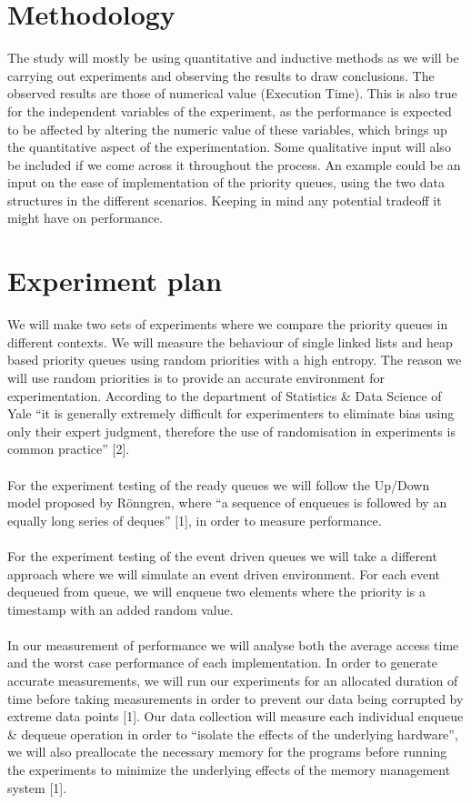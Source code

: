 \documentclass[12pt]{article}
\begin{document}
\section{Methodology}

 The study will mostly be using quantitative and inductive methods as we will be carrying out experiments and observing the results to draw conclusions. The observed results are those of numerical value (Execution Time). This is also true for the independent variables of the experiment, as the performance is expected to be affected by altering the numeric value of these variables, which brings up the quantitative aspect of the experimentation. Some qualitative input will also be included if we come across it throughout the process. An example could be an input on the ease of implementation of the priority queues, using the two data structures in the different scenarios. Keeping in mind any potential tradeoff it might have on performance. 
 
\section{Experiment plan}

We will make two sets of experiments where we compare the priority queues in different contexts. We will measure the behaviour of single linked lists and heap based priority queues using random priorities with a high entropy. The reason we will use random priorities is to provide an accurate environment for experimentation. According to the department of Statistics \& Data Science of Yale “it is generally extremely difficult for experimenters to eliminate bias using only their expert judgment, therefore the use of randomisation in experiments is common practice” [2]. 
\\
\\
For the experiment testing of the ready queues we will follow the Up/Down model proposed by Rönngren, where “a sequence of enqueues is followed by an equally long series of deques” [1], in order to measure performance. 
\\
\\
For the experiment testing of the event driven queues we will take a different approach where we will simulate an event driven environment. For each event dequeued from queue, we will enqueue two elements where the priority is a timestamp with an added random value.
\\
\\
In our measurement of performance we will analyse both the average access time and the worst case performance of each implementation. In order to generate accurate measurements, we will run our experiments for an allocated duration of time before taking measurements in order to prevent our data being corrupted by extreme data points [1]. Our data collection will measure each individual enqueue \& dequeue operation in order to “isolate the effects of the underlying hardware”, we will also preallocate the necessary memory for the programs before running the experiments to minimize the underlying effects of the memory management system [1]. 
\end{document}
